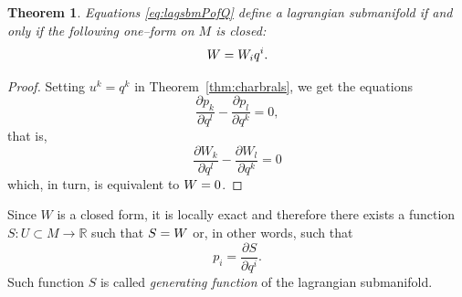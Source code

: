 \documentclass[english,fontsize=11pt,paper=a5,oneside]{scrbook}
\newcommand{\R}{\mathbb{R}}
\let\d\relax
\newcommand{\d}{\mathrm{d}}
\newtheorem{theorem}{Theorem}[chapter]
\theoremstyle{definition}
\begin{document}
\begin{theorem}\label{thm:lsoform}
  Equations \eqref{eq:lagsbmPofQ} define a lagrangian submanifold if and only if the following one--form on $M$ is closed:
  \begin{equation}
    W = W_i \d q^i.
  \end{equation}
\end{theorem}
\begin{proof}
  Setting $u^k = q^k$ in Theorem~\ref{thm:charbrals}, we get the equations
  \begin{equation}
    \frac{\partial p_k}{\partial q^l} - \frac{\partial p_l}{\partial q^k} = 0,
  \end{equation}
  that is,
  \begin{equation}
    \frac{\partial W_k}{\partial q^l} - \frac{\partial W_l}{\partial q^k} = 0
  \end{equation}
  which, in turn, is equivalent to $\d W = 0$.
\end{proof}

Since $W$ is a closed form, it is locally exact and therefore there exists a function $S: U \subset M \to \R$ such that $\d S = W$ or, in other words, such that
\begin{equation}
  p_i = \frac{\partial S}{\partial q^i}.
\end{equation}
Such function $S$ is called \emph{generating function} of the lagrangian submanifold.
\end{document}

